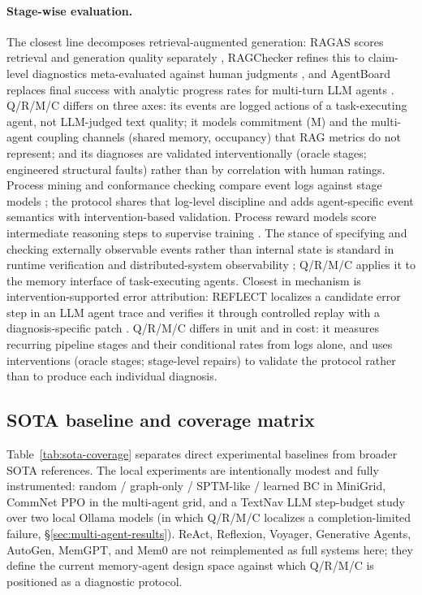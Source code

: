 \documentclass{article}
\begin{document}
\paragraph{Stage-wise evaluation.} The closest line decomposes retrieval-augmented generation: RAGAS scores retrieval and generation quality separately \citep{es2024ragas}, RAGChecker refines this to claim-level diagnostics meta-evaluated against human judgments \citep{ru2024ragchecker}, and AgentBoard replaces final success with analytic progress rates for multi-turn LLM agents \citep{ma2024agentboard}. Q/R/M/C differs on three axes: its events are logged actions of a task-executing agent, not LLM-judged text quality; it models commitment (M) and the multi-agent coupling channels (shared memory, occupancy) that RAG metrics do not represent; and its diagnoses are validated interventionally (oracle stages; engineered structural faults) rather than by correlation with human ratings. Process mining and conformance checking compare event logs against stage models \citep{vanderaalst2016process,carmona2018conformance}; the protocol shares that log-level discipline and adds agent-specific event semantics with intervention-based validation. Process reward models score intermediate reasoning steps to supervise training \citep{lightman2024verify}. The stance of specifying and checking externally observable events rather than internal state is standard in runtime verification and distributed-system observability \citep{leucker2009runtime}; Q/R/M/C applies it to the memory interface of task-executing agents. Closest in mechanism is intervention-supported error attribution: REFLECT localizes a candidate error step in an LLM agent trace and verifies it through controlled replay with a diagnosis-specific patch \citep{lin2026reflect}. Q/R/M/C differs in unit and in cost: it measures recurring pipeline stages and their conditional rates from logs alone, and uses interventions (oracle stages; stage-level repairs) to validate the protocol rather than to produce each individual diagnosis.

\subsection{SOTA baseline and coverage matrix}
\label{app:sota-coverage}

Table~\ref{tab:sota-coverage} separates direct experimental baselines from broader SOTA references. The local experiments are intentionally modest and fully instrumented: random / graph-only / SPTM-like / learned BC in MiniGrid, CommNet PPO in the multi-agent grid, and a TextNav LLM step-budget study over two local Ollama models (in which Q/R/M/C localizes a completion-limited failure, \S\ref{sec:multi-agent-results}). ReAct, Reflexion, Voyager, Generative Agents, AutoGen, MemGPT, and Mem0 are not reimplemented as full systems here; they define the current memory-agent design space against which Q/R/M/C is positioned as a diagnostic protocol.
\end{document}
